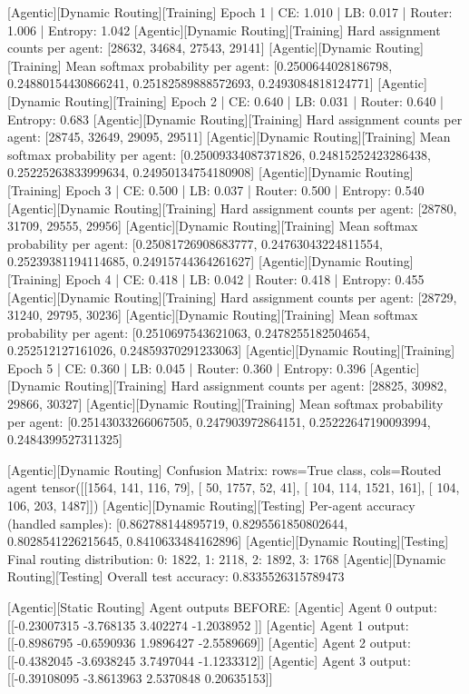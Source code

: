 [Agentic][Dynamic Routing][Training] Epoch 1 | CE: 1.010 | LB: 0.017 | Router: 1.006 | Entropy: 1.042
[Agentic][Dynamic Routing][Training] Hard assignment counts per agent: [28632, 34684, 27543, 29141]
[Agentic][Dynamic Routing][Training] Mean softmax probability per agent: [0.2500644028186798, 0.24880154430866241, 0.25182589888572693, 0.2493084818124771]
[Agentic][Dynamic Routing][Training] Epoch 2 | CE: 0.640 | LB: 0.031 | Router: 0.640 | Entropy: 0.683
[Agentic][Dynamic Routing][Training] Hard assignment counts per agent: [28745, 32649, 29095, 29511]
[Agentic][Dynamic Routing][Training] Mean softmax probability per agent: [0.25009334087371826, 0.24815252423286438, 0.25225263833999634, 0.24950134754180908]
[Agentic][Dynamic Routing][Training] Epoch 3 | CE: 0.500 | LB: 0.037 | Router: 0.500 | Entropy: 0.540
[Agentic][Dynamic Routing][Training] Hard assignment counts per agent: [28780, 31709, 29555, 29956]
[Agentic][Dynamic Routing][Training] Mean softmax probability per agent: [0.25081726908683777, 0.24763043224811554, 0.25239381194114685, 0.24915744364261627]
[Agentic][Dynamic Routing][Training] Epoch 4 | CE: 0.418 | LB: 0.042 | Router: 0.418 | Entropy: 0.455
[Agentic][Dynamic Routing][Training] Hard assignment counts per agent: [28729, 31240, 29795, 30236]
[Agentic][Dynamic Routing][Training] Mean softmax probability per agent: [0.2510697543621063, 0.2478255182504654, 0.252512127161026, 0.24859370291233063]
[Agentic][Dynamic Routing][Training] Epoch 5 | CE: 0.360 | LB: 0.045 | Router: 0.360 | Entropy: 0.396
[Agentic][Dynamic Routing][Training] Hard assignment counts per agent: [28825, 30982, 29866, 30327]
[Agentic][Dynamic Routing][Training] Mean softmax probability per agent: [0.25143033266067505, 0.247903972864151, 0.25222647190093994, 0.2484399527311325]

[Agentic][Dynamic Routing] Confusion Matrix: rows=True class, cols=Routed agent
tensor([[1564,  141,  116,   79],
[  50, 1757,   52,   41],
[ 104,  114, 1521,  161],
[ 104,  106,  203, 1487]])
[Agentic][Dynamic Routing][Testing] Per-agent accuracy (handled samples): [0.862788144895719, 0.8295561850802644, 0.8028541226215645, 0.8410633484162896]
[Agentic][Dynamic Routing][Testing] Final routing distribution: {0: 1822, 1: 2118, 2: 1892, 3: 1768}
[Agentic][Dynamic Routing][Testing] Overall test accuracy: 0.8335526315789473

[Agentic][Static Routing] Agent outputs BEFORE:
[Agentic] Agent 0 output: [[-0.23007315 -3.768135    3.402274   -1.2038952 ]]
[Agentic] Agent 1 output: [[-0.8986795 -0.6590936  1.9896427 -2.5589669]]
[Agentic] Agent 2 output: [[-0.4382045 -3.6938245  3.7497044 -1.1233312]]
[Agentic] Agent 3 output: [[-0.39108095 -3.8613963   2.5370848   0.20635153]]

